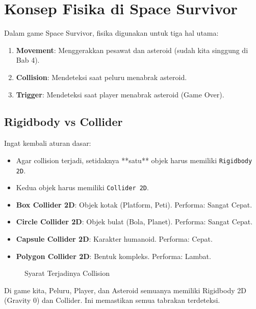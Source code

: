 
\section{Konsep Fisika di Space Survivor}

Dalam game Space Survivor, fisika digunakan untuk tiga hal utama:
\begin{enumerate}
    \item \textbf{Movement}: Menggerakkan pesawat dan asteroid (sudah kita singgung di Bab 4).
    \item \textbf{Collision}: Mendeteksi saat peluru menabrak asteroid.
    \item \textbf{Trigger}: Mendeteksi saat player menabrak asteroid (Game Over).
\end{enumerate}

\subsection{Rigidbody vs Collider}
Ingat kembali aturan dasar:
\begin{itemize}
    \item Agar collision terjadi, setidaknya **satu** objek harus memiliki \texttt{Rigidbody 2D}.
    \item Kedua objek harus memiliki \texttt{Collider 2D}.
\end{itemize}

\begin{itemize}
    \item \textbf{Box Collider 2D}: Objek kotak (Platform, Peti). Performa: Sangat Cepat.
    \item \textbf{Circle Collider 2D}: Objek bulat (Bola, Planet). Performa: Sangat Cepat.
    \item \textbf{Capsule Collider 2D}: Karakter humanoid. Performa: Cepat.
    \item \textbf{Polygon Collider 2D}: Bentuk kompleks. Performa: Lambat.
\end{itemize}

\begin{figure}[ht]
    \centering
    \caption{Syarat Terjadinya Collision}
    \label{fig:collision_req}
\end{figure}

Di game kita, Peluru, Player, dan Asteroid semuanya memiliki Rigidbody 2D (Gravity 0) dan Collider. Ini memastikan semua tabrakan terdeteksi.
